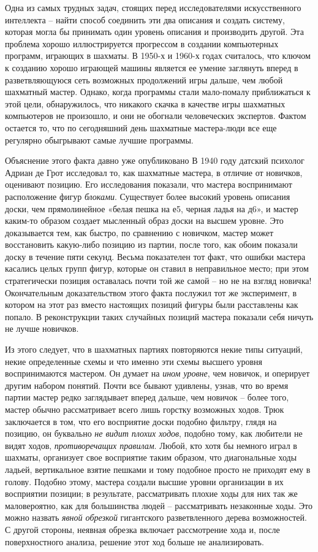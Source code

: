 \documentclass[../main.tex]{subfiles}
\begin{document}
Одна из самых трудных задач, стоящих перед исследователями искусственного интеллекта \--- найти способ соединить эти два описания и создать систему, которая могла бы принимать один уровень описания и производить другой. Эта проблема хорошо иллюстрируется прогрессом в создании компьютерных программ, играющих в шахматы. В 1950-х и 1960-х годах считалось, что ключом к созданию хорошо играющей машины является ее умение заглянуть вперед в разветвляющуюся сеть возможных продолжений игры дальше, чем любой шахматный мастер. Однако, когда программы стали мало-помалу приближаться к этой цели, обнаружилось, что никакого скачка в качестве игры шахматных компьютеров не произошло, и они не обогнали человеческих экспертов. Фактом остается то, что по сегодняшний день шахматные мастера-люди все еще регулярно обыгрывают самые лучшие программы.

Объяснение этого факта давно уже опубликовано В 1940 году датский психолог Адриан де Грот исследовал то, как шахматные мастера, в отличие от новичков, оценивают позицию. Его исследования показали, что мастера воспринимают расположение фигур \emph{блоками}. Существует более высокий уровень описания доски, чем прямолинейное «белая пешка на е5, черная ладья на д6», и мастер каким-то образом создает мысленный образ доски на высшем уровне. Это доказывается тем, как быстро, по сравнению с новичком, мастер может восстановить какую-либо позицию из партии, после того, как обоим показали доску в течение пяти секунд. Весьма показателен тот факт, что ошибки мастера касались целых групп фигур, которые он ставил в неправильное место; при этом стратегически позиция оставалась почти той же самой \--- но не на взгляд новичка! Окончательным доказательством этого факта послужил тот же эксперимент, в котором на этот раз вместо настоящих позиций фигуры были расставлены как попало. В реконструкции таких случайных позиций мастера показали себя ничуть не лучше новичков.

Из этого следует, что в шахматных партиях повторяются некие типы ситуаций, некие определенные схемы и что именно эти схемы высшего уровня воспринимаются мастером. Он думает на \emph{ином уровне}, чем новичок, и оперирует другим набором понятий. Почти все бывают удивлены, узнав, что во время партии мастер редко заглядывает вперед дальше, чем новичок \--- более того, мастер обычно рассматривает всего лишь горстку возможных ходов. Трюк заключается в том, что его восприятие доски подобно фильтру, глядя на позицию, он буквально \emph{не видит плохих ходов}, подобно тому, как любители не видят ходов, \emph{противоречащих правилам}. Любой, кто хотя бы немного играл в шахматы, организует свое восприятие таким образом, что диагональные ходы ладьей, вертикальное взятие пешками и тому подобное просто не приходят ему в голову. Подобно этому, мастера создали высшие уровни организации в их восприятии позиции; в результате, рассматривать плохие ходы для них так же маловероятно, как для большинства людей \--- рассматривать незаконные ходы. Это можно назвать \emph{явной обрезкой} гигантского разветвленного дерева возможностей. С другой стороны, неявная обрезка включает рассмотрение хода и, после поверхностного анализа, решение этот ход больше не анализировать.
\end{document}
